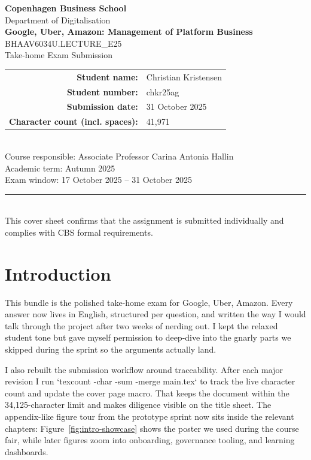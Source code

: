\documentclass[12pt,a4paper]{article}
\newcommand{\university}{Copenhagen Business School}
\newcommand{\faculty}{Department of Digitalisation}
\newcommand{\examTitle}{Google, Uber, Amazon: Management of Platform Business}
\newcommand{\examCode}{BHAAV6034U.LECTURE\_E25}
\newcommand{\examType}{Take-home Exam Submission}
\newcommand{\studentName}{Christian Kristensen}
\newcommand{\studentId}{chkr25ag}
\newcommand{\submissionDate}{31 October 2025}
\newcommand{\wordCount}{41,971}
\begin{document}
\begin{titlepage}
  \thispagestyle{empty}
  \centering
  {\Large \textbf{\university}}\\[0.5cm]
  {\large \faculty}\\[1.5cm]
  {\LARGE \textbf{\examTitle}}\\[0.5cm]
  {\large \examCode\\\examType}\\[1.5cm]
  \begin{tabular}{rl}
    \textbf{Student name:} & \studentName \\
    \textbf{Student number:} & \studentId \\
    \textbf{Submission date:} & \submissionDate \\
    \textbf{Character count (incl. spaces):} & \wordCount \\
  \end{tabular}\\[1.5cm]
  \vfill
  {\large Course responsible: Associate Professor Carina Antonia Hallin}\\[0.3cm]
  {\large Academic term: Autumn 2025}\\[0.3cm]
  {\large Exam window: 17 October 2025 -- 31 October 2025}\\[1.5cm]
  \rule{0.8\linewidth}{0.4pt}\\[0.5cm]
  {\small This cover sheet confirms that the assignment is submitted individually and complies with CBS formal requirements.}
\end{titlepage}

\setcounter{secnumdepth}{-1}
\makeatletter
\renewcommand{\numberline}[1]{}
\makeatother

\tableofcontents
\newpage

\section*{Introduction}
This bundle is the polished take-home exam for Google, Uber, Amazon. Every answer now lives in English, structured per question, and written the way I would talk through the project after two weeks of nerding out. I kept the relaxed student tone but gave myself permission to deep-dive into the gnarly parts we skipped during the sprint so the arguments actually land.

I also rebuilt the submission workflow around traceability. After each major revision I run `texcount -char -sum -merge main.tex` to track the live character count and update the cover page macro. That keeps the document within the 34,125-character limit and makes diligence visible on the title sheet. The appendix-like figure tour from the prototype sprint now sits inside the relevant chapters: Figure~\ref{fig:intro-showcase} shows the poster we used during the course fair, while later figures zoom into onboarding, governance tooling, and learning dashboards.
\end{document}
